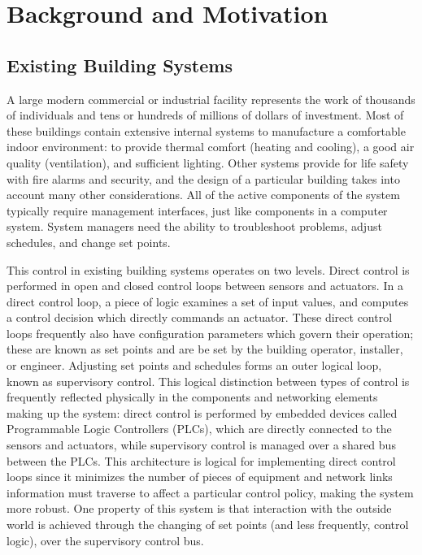 \section{Background and Motivation}


\subsection{Existing Building Systems}

A large modern commercial or industrial facility represents the work of thousands of individuals and tens or hundreds of millions of dollars of investment.  Most of these buildings contain extensive internal systems to manufacture a comfortable indoor environment: to provide thermal comfort (heating and cooling), a good air quality (ventilation), and sufficient lighting.  Other systems provide for life safety with fire alarms and security, and the design of a particular building takes into account many other considerations.  All of the active components of the system typically require management interfaces, just like components in a computer system.  System managers need the ability to troubleshoot problems, adjust schedules, and change set points. 

This control in existing building systems operates on two levels.  Direct control is performed in open and closed control loops between sensors and actuators.  In a direct control loop, a piece of logic examines a set of input values, and computes a control decision which directly commands an actuator.   These direct control loops frequently also have configuration parameters which govern their operation; these are known as set points and are be set by the building operator, installer, or engineer.  Adjusting set points and schedules forms an outer logical loop, known as supervisory control.  This logical distinction between types of control is frequently reflected physically in the components and networking elements making up the system: direct control is performed by embedded devices called Programmable Logic Controllers (PLCs), which are directly connected to the sensors and actuators, while supervisory control is managed over a shared bus between the PLCs.  This architecture is logical for implementing direct control loops since it minimizes the number of pieces of equipment and network links information must traverse to affect a particular control policy, making the system more robust.  One property of this system is that interaction with the outside world is achieved through the changing of set points (and less frequently, control logic), over the supervisory control bus.  

